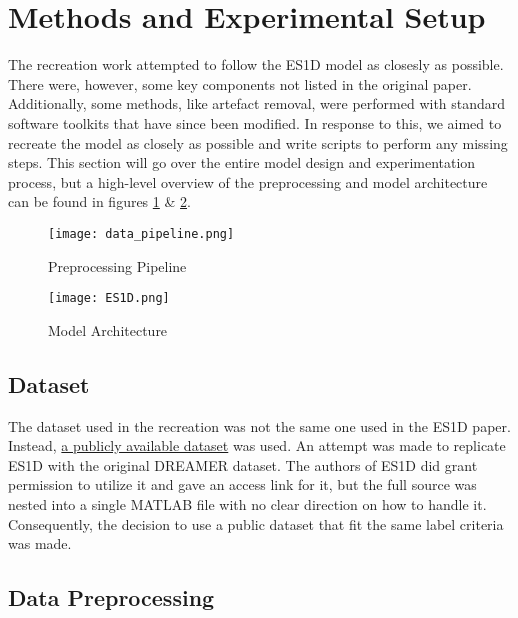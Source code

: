 \section{Methods and Experimental Setup}
The recreation work attempted to follow the ES1D model as closesly as possible.
There were, however, some key components not listed in the original paper.
Additionally, some methods, like artefact removal, were performed with standard software toolkits that have since been modified.
In response to this, we aimed to recreate the model as closely as possible and write scripts to perform any missing steps.
This section will go over the entire model design and experimentation process, but a high-level overview of the preprocessing and model architecture can be found in figures \ref{fig:preprocessing} \& \ref{fig:model_architecture}.

\begin{center}
    \begin{figure}[h]
        \centering
        \texttt{[image: data\_pipeline.png]}
        \caption{\small{Preprocessing Pipeline}}
        \label{fig:preprocessing}
    \end{figure}
    \begin{figure}[h]
        \centering

        \texttt{[image: ES1D.png]}
        \caption{\small{Model Architecture}}
        \label{fig:model_architecture}
    \end{figure}
\end{center}

\subsection{Dataset}
The dataset used in the recreation was not the same one used in the ES1D paper. Instead, \href{https://www.kaggle.com/datasets/ayurgo/data-eeg-age-v1}{a publicly available dataset} was used.
An attempt was made to replicate ES1D with the original DREAMER dataset.
The authors of ES1D did grant permission to utilize it and gave an access link for it, but the full source was nested into a single MATLAB file with no clear direction on how to handle it.
Consequently, the decision to use a public dataset that fit the same label criteria was made.

\subsection{Data Preprocessing}


